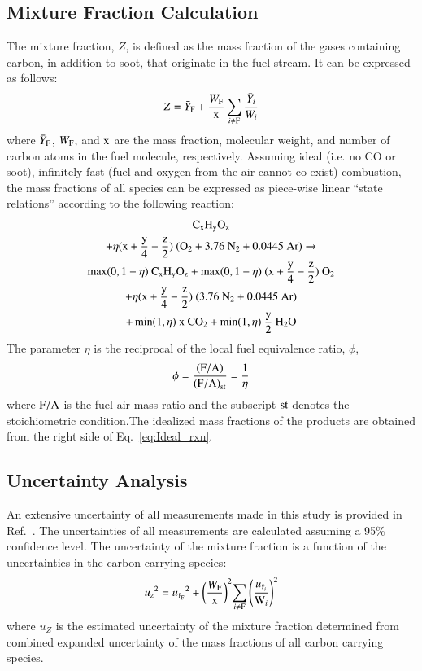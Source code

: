\documentclass[preprint,review,12pt]{elsarticle}
\begin{document}
\subsection{Mixture Fraction Calculation}
\label{ssec:Mixture_Fraction_Calculation}
The mixture fraction, $Z$, is defined as the mass fraction of the gases containing carbon, in addition to soot, that originate in the fuel stream. It can be expressed as follows:
\begin{equation}\label{eq:Mixture_Fraction}
Z = \bar{Y}_{\rm F} + \frac{W_{\rm F}}{\rm x} \sum_{i\ne{\rm F}} \frac{\bar{Y}_i}{W_{i}}
\end{equation}
where $\bar{Y}_{\rm F}$, ${W_{\rm F}}$, and $\rm x$ are the mass fraction, molecular weight, and number of carbon atoms in the fuel molecule, respectively. Assuming ideal (i.e. no CO or soot), infinitely-fast (fuel and oxygen from the air cannot co-exist) combustion, the mass fractions of all species can be expressed as piece-wise linear ``state relations'' according to the following reaction:
\begin{multline}\label{eq:Ideal_rxn}
{\rm C}_{\rm x}{\rm H}_{\rm y}{\rm O}_{\rm z}\\ +\eta(\rm x+\frac{\rm y}{4}-\frac{\rm z}{2})~({\rm O}_{2}+3.76~{\rm N}_{2}+0.0445~{\rm Ar}) \rightarrow \\ \max(0,1-\eta)~{\rm C}_{\rm x}{\rm H}_{\rm y}{\rm O}_{\rm z}+\max(0,1- \eta)~(\rm x+\frac{\rm y}{4}-\frac{\rm z}{2})~{\rm O}_{2} \\ +\eta(\rm x+\frac{\rm y}{4}-\frac{\rm z}{2})~(3.76~{\rm N}_{2}+0.0445~{\rm Ar})\\+ \min(1,\eta)~{\rm x}~{\rm CO}_2+\min(1,\eta)~\frac{\rm y}{2}~{\rm H}_{2}{\rm O}
\end{multline}
The parameter $\eta$ is the reciprocal of the local fuel equivalence ratio, $\phi$,
\begin{equation}\label{eq:Eta}
\phi=\frac{\rm (F/A)}{{\rm (F/A)}_{\rm st}}=\frac{1}{\eta}
\end{equation}
where $\rm F/A$ is the fuel-air mass ratio and the subscript $\rm st$ denotes the stoichiometric condition.The idealized mass fractions of the products are obtained from the right side of Eq.~\ref{eq:Ideal_rxn}.
\subsection{Uncertainty Analysis}
\label{ssec:Uncertainty Analysis}
An extensive uncertainty of all measurements made in this study is provided in Ref.~\cite{Falkenstein2019}. The uncertainties of all measurements are calculated assuming a 95\% confidence level. The uncertainty of the mixture fraction is a function of the uncertainties in the carbon carrying species:
\begin{equation}
\label{eq:mixture_frac_uncertainty}
{u_{\scriptscriptstyle Z}}^2={{u_{\scriptscriptstyle \bar{Y}_{\rm F}}}^2+{\left(\frac{W_{\rm F}}{\rm x}\right)}^2{\sum_{i\ne {\rm F}}{\left(\frac{u_{\scriptscriptstyle \bar{Y}_{i}}}{\textrm{W}_{i}} \right)}^2}}
\end{equation}
where $u_{\scriptscriptstyle Z}$ is the estimated uncertainty of the mixture fraction determined from combined expanded uncertainty of the mass fractions of all carbon carrying species.
\end{document}
